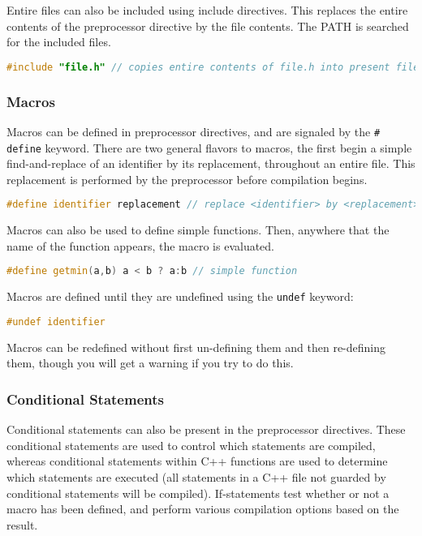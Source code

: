 \documentclass[10pt]{article}
\begin{document}
Entire files can also be included using include directives. This replaces the entire contents of the preprocessor directive by the file contents. The PATH is searched for the included files. 

\begin{lstlisting}[language=C++]
#include "file.h" // copies entire contents of file.h into present file
\end{lstlisting}

\subsubsection{Macros}

Macros can be defined in preprocessor directives, and are signaled by the \texttt{\# define} keyword. There are two general flavors to macros, the first begin a simple find-and-replace of an identifier by its replacement, throughout an entire file. This replacement is performed by the preprocessor before compilation begins.

\begin{lstlisting}[language=C++]
#define identifier replacement // replace <identifier> by <replacement>
\end{lstlisting}

Macros can also be used to define simple functions. Then, anywhere that the name of the function appears, the macro is evaluated. 

\begin{lstlisting}[language=C++]
#define getmin(a,b) a < b ? a:b // simple function
\end{lstlisting}

Macros are defined until they are undefined using the \texttt{undef} keyword:

\begin{lstlisting}[language=C++]
#undef identifier
\end{lstlisting}

Macros can be redefined without first un-defining them and then re-defining them, though you will get a warning if you try to do this.

\subsubsection{Conditional Statements}

Conditional statements can also be present in the preprocessor directives. These conditional statements are used to control which statements are compiled, whereas conditional statements within C++ functions are used to determine which statements are executed (all statements in a C++ file not guarded by conditional statements will be compiled). If-statements test whether or not a macro has been defined, and perform various compilation options based on the result.
\end{document}
